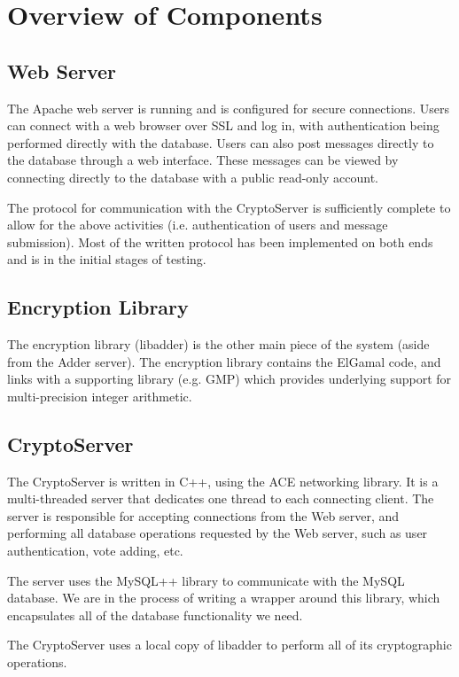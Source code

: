 \documentclass[letterpaper,10pt]{article}
\begin{document}
\section{Overview of Components}

\subsection{Web Server}

The Apache web server is running and is configured for secure
connections. Users can connect with a web browser over SSL and log in,
with authentication being performed directly with the database. Users
can also post messages directly to the database through a web
interface. These messages can be viewed by connecting directly to the
database with a public read-only account.

The protocol for communication with the CryptoServer is sufficiently
complete to allow for the above activities (i.e. authentication of
users and message submission). Most of the written protocol has been
implemented on both ends and is in the initial stages of testing.

\subsection{Encryption Library}

The encryption library (libadder) is the other main piece of the
system (aside from the Adder server). The encryption library contains
the ElGamal code, and links with a supporting library (e.g. GMP) which
provides underlying support for multi-precision integer arithmetic.

\subsection{CryptoServer}

The CryptoServer is written in C++, using the ACE networking library.
It is a multi-threaded server that dedicates one thread to each
connecting client. The server is responsible for accepting connections
from the Web server, and performing all database operations requested
by the Web server, such as user authentication, vote adding, etc.

The server uses the MySQL++ library to communicate with the MySQL
database. We are in the process of writing a wrapper around this
library, which encapsulates all of the database functionality we need.

The CryptoServer uses a local copy of libadder to perform all of its
cryptographic operations.
\end{document}

